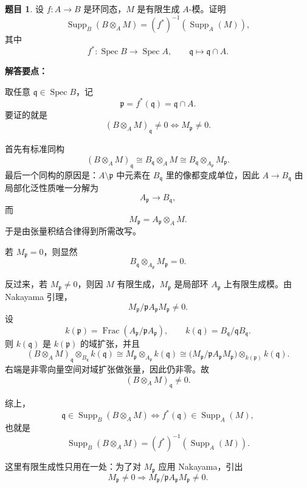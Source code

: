 \documentclass[a4paper]{ctexart}
\theoremstyle{definition}
\newtheorem{example}{题目}[section]
\theoremstyle{analysis}
\theoremstyle{plain}
\begin{document}
\begin{example}
设 \(f:A\to B\) 是环同态，\(M\) 是有限生成 \(A\)-模。证明
\[
  \operatorname{Supp}_B(B\otimes_A M)
  =
  (f^*)^{-1}(\operatorname{Supp}_A(M)),
\]
其中
\[
  f^*:\operatorname{Spec}B\to \operatorname{Spec}A,
  \qquad
  \mathfrak q\mapsto \mathfrak q\cap A.
\]

\textbf{解答要点：}

取任意 \(\mathfrak q\in \operatorname{Spec}B\)，记
\[
  \mathfrak p=f^*(\mathfrak q)=\mathfrak q\cap A.
\]
要证的就是
\[
  (B\otimes_A M)_{\mathfrak q}\neq 0
  \iff
  M_{\mathfrak p}\neq 0.
\]

首先有标准同构
\[
  (B\otimes_A M)_{\mathfrak q}
  \cong
  B_{\mathfrak q}\otimes_A M
  \cong
  B_{\mathfrak q}\otimes_{A_{\mathfrak p}} M_{\mathfrak p}.
\]
最后一个同构的原因是：\(A\setminus \mathfrak p\) 中元素在 \(B_{\mathfrak q}\) 里的像都变成单位，因此 \(A\to B_{\mathfrak q}\) 由局部化泛性质唯一分解为
\[
  A_{\mathfrak p}\to B_{\mathfrak q},
\]
而
\[
  M_{\mathfrak p}=A_{\mathfrak p}\otimes_A M.
\]
于是由张量积结合律得到所需改写。

若 \(M_{\mathfrak p}=0\)，则显然
\[
  B_{\mathfrak q}\otimes_{A_{\mathfrak p}} M_{\mathfrak p}=0.
\]

反过来，若 \(M_{\mathfrak p}\neq 0\)，则因 \(M\) 有限生成，\(M_{\mathfrak p}\) 是局部环 \(A_{\mathfrak p}\) 上有限生成模。由 Nakayama 引理，
\[
  M_{\mathfrak p}/\mathfrak pA_{\mathfrak p}M_{\mathfrak p}\neq 0.
\]
设
\[
  k(\mathfrak p)=\operatorname{Frac}(A_{\mathfrak p}/\mathfrak pA_{\mathfrak p}),
  \qquad
  k(\mathfrak q)=B_{\mathfrak q}/\mathfrak qB_{\mathfrak q}.
\]
则 \(k(\mathfrak q)\) 是 \(k(\mathfrak p)\) 的域扩张，并且
\[
  (B\otimes_A M)_{\mathfrak q}\otimes_{B_{\mathfrak q}} k(\mathfrak q)
  \cong
  M_{\mathfrak p}\otimes_{A_{\mathfrak p}} k(\mathfrak q)
  \cong
  \bigl(M_{\mathfrak p}/\mathfrak pA_{\mathfrak p}M_{\mathfrak p}\bigr)\otimes_{k(\mathfrak p)} k(\mathfrak q).
\]
右端是非零向量空间对域扩张做张量，因此仍非零。故
\[
  (B\otimes_A M)_{\mathfrak q}\neq 0.
\]

综上，
\[
  \mathfrak q\in \operatorname{Supp}_B(B\otimes_A M)
  \iff
  f^*(\mathfrak q)\in \operatorname{Supp}_A(M),
\]
也就是
\[
  \operatorname{Supp}_B(B\otimes_A M)
  =
  (f^*)^{-1}(\operatorname{Supp}_A(M)).
\]

这里有限生成性只用在一处：为了对 \(M_{\mathfrak p}\) 应用 Nakayama，引出
\[
  M_{\mathfrak p}\neq 0
  \Rightarrow
  M_{\mathfrak p}/\mathfrak pA_{\mathfrak p}M_{\mathfrak p}\neq 0.
\]
\end{example}
\end{document}
